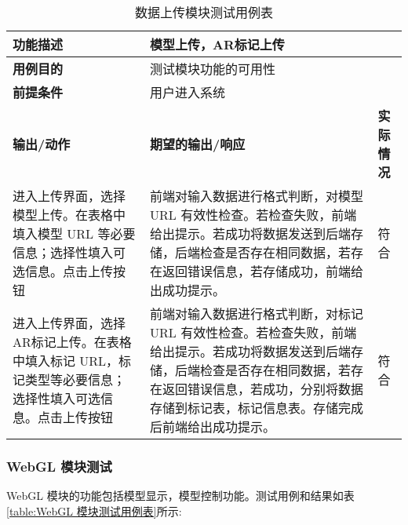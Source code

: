 \begin{table}[H]
  \centering
  \small
  \renewcommand\arraystretch{1.1}
  \caption{数据上传模块测试用例表}
  \label{table:数据上传模块测试用例表}
  \setlength{\tabcolsep}{4mm}
  \begin{tabular}{|p{4.5cm}|p{6.5cm}|p{1.5cm}|}
    \hline \textbf{功能描述} & \multicolumn{2}{l|}{模型上传，AR标记上传} \\
    \hline \textbf{用例目的} & \multicolumn{2}{l|}{测试模块功能的可用性} \\
    \hline \textbf{前提条件} & \multicolumn{2}{l|}{用户进入系统} \\
    \hline \textbf{输出/动作} & \textbf{期望的输出/响应} & \textbf{实际情况} \\
    \hline 进入上传界面，选择模型上传。在表格中填入模型 URL 等必要信息；选择性填入可选信息。点击上传按钮 & 前端对输入数据进行格式判断，对模型 URL 有效性检查。若检查失败，前端给出提示。若成功将数据发送到后端存储，后端检查是否存在相同数据，若存在返回错误信息，若存储成功，前端给出成功提示。 & 符合  \\
    \hline 进入上传界面，选择AR标记上传。在表格中填入标记 URL，标记类型等必要信息；选择性填入可选信息。点击上传按钮 & 前端对输入数据进行格式判断，对标记 URL 有效性检查。若检查失败，前端给出提示。若成功将数据发送到后端存储，后端检查是否存在相同数据，若存在返回错误信息，若成功，分别将数据存储到标记表，标记信息表。存储完成后前端给出成功提示。 & 符合  \\
    \hline
  \end{tabular}
\end{table}

\subsubsection{WebGL 模块测试}

WebGL 模块的功能包括模型显示，模型控制功能。测试用例和结果如表\ref{table:WebGL 模块测试用例表}所示:

